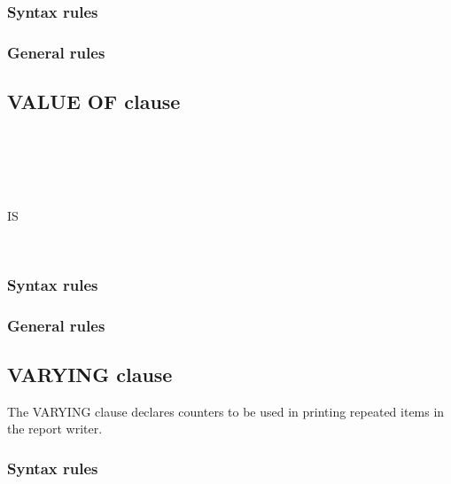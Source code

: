 \subsubsection{Syntax rules}

\subsubsection{General rules}

\subsection{VALUE OF clause}

\begin{syntax}[\deletedcolour]
  \begin{1=}
     \\
  \end{1=}
  \begin{1=}
     \\
     \\
    \identifier
  \end{1=}
  IS
  \begin{1=}
    \literal \\
    \identifier
  \end{1=}
\end{syntax}

\subsubsection{Syntax rules}

\subsubsection{General rules}

\subsection{VARYING clause}

The VARYING clause declares counters to be used in printing repeated items in the report writer.

\begin{syntax}
\end{syntax}

\subsubsection{Syntax rules}

